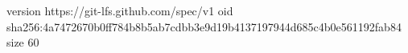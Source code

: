 version https://git-lfs.github.com/spec/v1
oid sha256:4a7472670b0ff784b8b5ab7cdbb3e9d19b4137197944d685c4b0e561192fab84
size 60
